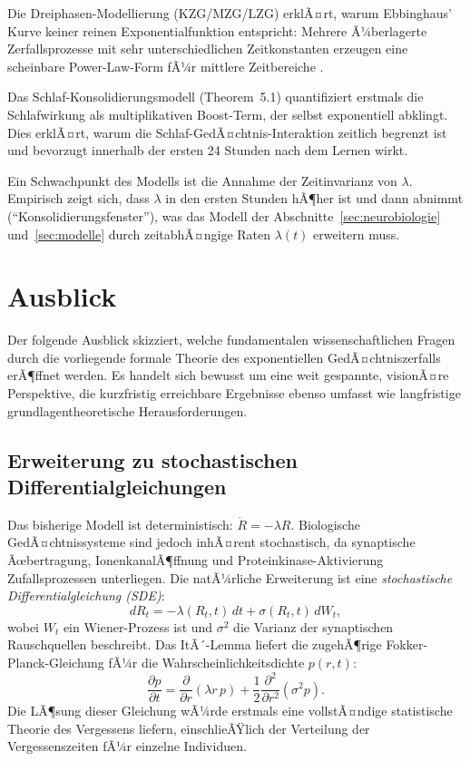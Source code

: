﻿\documentclass[12pt,a4paper,twoside]{article}
\theoremstyle{theormstyle}
\theoremstyle{proofstyle}
\begin{document}
	Die Dreiphasen-Modellierung (KZG/MZG/LZG) erklÃ¤rt, warum Ebbinghaus'
	Kurve keiner reinen Exponentialfunktion entspricht: Mehrere Ã¼berlagerte
	Zerfallsprozesse mit sehr unterschiedlichen Zeitkonstanten erzeugen
	eine scheinbare Power-Law-Form fÃ¼r mittlere Zeitbereiche \citep{wixted2004psychology}.
	
	Das Schlaf-Konsolidierungsmodell (Theorem~5.1) quantifiziert erstmals
	die Schlafwirkung als multiplikativen Boost-Term,
	der selbst exponentiell abklingt. Dies erklÃ¤rt, warum die
	Schlaf-GedÃ¤chtnis-Interaktion zeitlich begrenzt ist und bevorzugt
	innerhalb der ersten 24 Stunden nach dem Lernen wirkt.
	
	Ein Schwachpunkt des Modells ist die Annahme der Zeitinvarianz von $\lambda$.
	Empirisch zeigt sich, dass $\lambda$ in den ersten Stunden hÃ¶her ist
	und dann abnimmt (``Konsolidierungsfenster''), was das Modell
	der Abschnitte~\ref{sec:neurobiologie} und~\ref{sec:modelle} durch
	zeitabhÃ¤ngige Raten $\lambda(t)$ erweitern muss.
	
	\section{Ausblick}
	\label{sec:ausblick}
	
	Der folgende Ausblick skizziert, welche fundamentalen wissenschaftlichen
	Fragen durch die vorliegende formale Theorie des exponentiellen GedÃ¤chtniszerfalls
	erÃ¶ffnet werden. Es handelt sich bewusst um eine weit gespannte, visionÃ¤re
	Perspektive, die kurzfristig erreichbare Ergebnisse ebenso umfasst wie
	langfristige grundlagentheoretische Herausforderungen.
	
	\subsection{Erweiterung zu stochastischen Differentialgleichungen}
	
	Das bisherige Modell ist deterministisch: $\dot{R} = -\lambda R$.
	Biologische GedÃ¤chtnissysteme sind jedoch inhÃ¤rent stochastisch,
	da synaptische Ãœbertragung, IonenkanalÃ¶ffnung und Proteinkinase-Aktivierung
	Zufallsprozessen unterliegen. Die natÃ¼rliche Erweiterung ist eine
	\emph{stochastische Differentialgleichung (SDE)}:
	\[
	dR_t = -\lambda(R_t, t)\,dt + \sigma(R_t, t)\,dW_t,
	\]
	wobei $W_t$ ein Wiener-Prozess ist und $\sigma^2$ die Varianz der
	synaptischen Rauschquellen beschreibt. Das ItÃ´-Lemma liefert die
	zugehÃ¶rige Fokker-Planck-Gleichung fÃ¼r die Wahrscheinlichkeitsdichte
	$p(r, t)$:
	\[
	\frac{\partial p}{\partial t}
	= \frac{\partial}{\partial r}(\lambda r\,p)
	+ \frac{1}{2}\frac{\partial^2}{\partial r^2}(\sigma^2 p).
	\]
	Die LÃ¶sung dieser Gleichung wÃ¼rde erstmals eine vollstÃ¤ndige statistische
	Theorie des Vergessens liefern, einschlieÃŸlich der Verteilung der
	Vergessenszeiten fÃ¼r einzelne Individuen.
	
\end{document}
